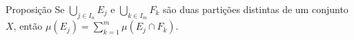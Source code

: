 \begin{comment}
	

\begin{env}{Exemplo}
	\label{ex: função característica é uma medida}
	Seja $\cc$ uma \sigal e $E \subset \cc$.
	A função característica $\chi_{E}: \cc \to \R$ é uma medida sobre $\cc$.
	De fato, $\chi_{\varnothing} = 0$, pois não há elementos em $\varnothing$.
	Pela definição de função característica, temos que $\chi_E(x) \neq 0$ para qualquer que seja $E \in \cc$.
	Por fim, Se $(E_n)$ é uma sequência disjunta de elementos de $\cc$, sempre temos $\chi_{\bigcap_{n \in \N}E_n} = 0$.
	Caso $\chi_{\bigcup_{n \in \N}E_n}(x) = 0$, então $x \notin \bigcup_{n \in \N}E_n$. 
	Logo, $x \notin E_n,\ \forall n \in \N$.
	Logo, $\chi_{E_n}(x) = 0$ para qualquer que seja $n \in \N$, 
	Com isso, $\dsum_{n \in \N} \chi_{E_n}(x) = 0 = \chi_{\bigcup_{n \in \N}E_n}(x)$.
	
	Caso ocorra que  $\chi_{\bigcup_{n \in \N}E_n}(x) = 1$, então existe um $n_0 \in \N$ tal que $ x \in E_{n_0}$.
	Como a sequência de conjuntos é disjunta, o $n_0$ é único.
	Logo, $x \notin E_p$ para qualquer $p \neq n_0$, ou seja, $\chi_{E_p}(x) = 0, \ \forall p \neq n_0$.
	Com isso, $\dsum_{p \neq n_0} \chi_{E_p}(x) + \chi_{E_{n_0}}(x) = 0 + 1 =  \chi_{\bigcup_{n \in \N}E_n}(x)$.
	Em todo caso, $\chi_{\bigcup_{n \in \N}E_n}(x) = \dsum_{n \in \N} \chi_{E_n}(x)$. 
	Portanto, $\chi_E$ é uma medida.
\end{env}
\end{comment}


\begin{comment}
	\begin{env}{Exemplo}
		Seja $X = \N$ e $\mathcal{C}$ sendo o conjunto das partes de $\N$. 
		para $A \in \mathcal{C}$, definimos $\mu(A)$ por meio da sua cardinalidade, isto é, se $A$ é finito, então $\mu(A)$ é quantidade de elementos de $A$. Caso contrário, $\mu(A) = +\infty$.	
	\end{env}
\end{comment}


\begin{env}{Proposição}
	\label{prop: medida com partição}
	Se $\displaystyle \bigcup_{j \in I_n} E_j$ e $\displaystyle\bigcup_{k \in I_m} F_k$ são duas partições distintas de um conjunto $X$, então 
	$\displaystyle \mu(E_j) 
	= 
	\sum_{k = 1}^{m} \mu(E_j\cap F_k)$.
\end{env}

